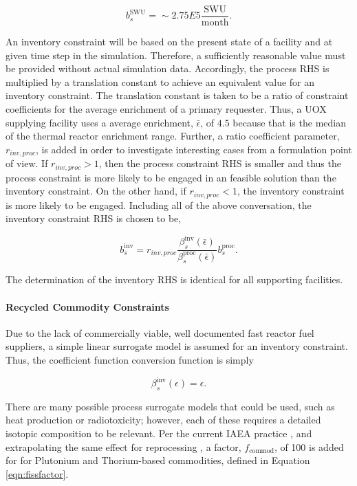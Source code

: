 \begin{equation}
b^{\text{SWU}}_s = \sim 2.75E5 \frac{\text{SWU}}{\text{month}}.
\end{equation}

An inventory constraint will be based on the present state of a facility and at
given time step in the simulation. Therefore, a sufficiently reasonable value
must be provided without actual simulation data. Accordingly, the process RHS is
multiplied by a translation constant to achieve an equivalent value for an
inventory constraint. The translation constant is taken to be a ratio of
constraint coefficients for the average enrichment of a primary requester. Thus,
a UOX supplying facility uses a average enrichment, $\bar{\epsilon}$, of $4.5$
because that is the median of the thermal reactor enrichment range. Further, a
ratio coefficient parameter, $r_{inv, proc}$, is added in order to investigate
interesting cases from a formulation point of view. If $r_{inv, proc} > 1$, then
the process constraint RHS is smaller and thus the process constraint is more
likely to be engaged in an feasible solution than the inventory constraint. On
the other hand, if $r_{inv, proc} < 1$, the inventory constraint is more likely
to be engaged. Including all of the above conversation, the inventory constraint RHS is chosen to be,

\begin{equation}
b^{\text{inv}}_s = 
r_{inv, proc} 
\frac{\beta^{\text{inv}}_s(\bar{\epsilon})}{\beta^{\text{proc}}_s(\bar{\epsilon})} 
b^{\text{proc}}_s.
\end{equation}

The determination of the inventory RHS is identical for all supporting
facilities.

\paragraph{Recycled Commodity Constraints}

Due to the lack of commercially viable, well documented fast reactor fuel
suppliers, a simple linear surrogate model is assumed for an inventory
constraint. Thus, the coefficient function conversion function is simply 

\begin{equation}
\beta^{\text{inv}}_s(\epsilon) = \epsilon. 
\end{equation}

There are many possible process surrogate models that could be used, such as
heat production or radiotoxicity; however, each of these requires a detailed
isotopic composition to be relevant. Per the current IAEA practice
\cite{heinonen2010}, and extrapolating the same effect for reprocessing
, a factor, $f_{\text{commod}}$, of 100 is added for for Plutonium
and Thorium-based commodities, defined in Equation \ref{eqn:fissfactor}.


